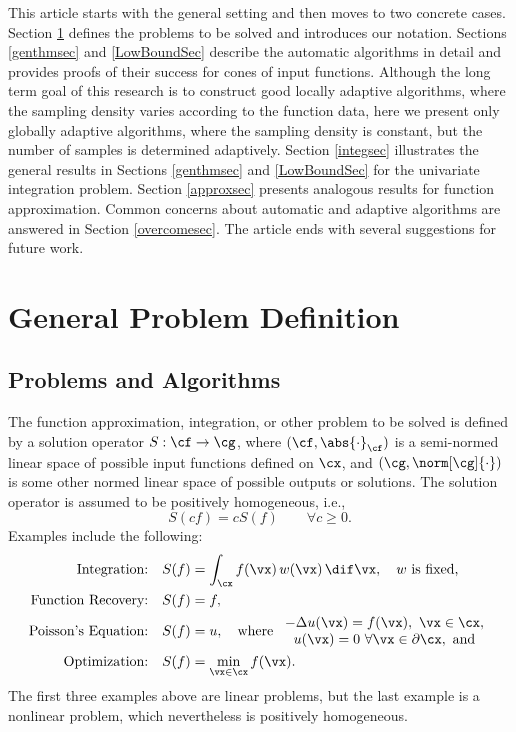 \documentclass[]{elsarticle}
\theoremstyle{definition}
\theoremstyle{remark}
\newcommand{\Fnorm}[1]{\abs{#1}_{\cf}}
\begin{document}
This article starts with the general setting and then moves to two concrete cases.  Section \ref{probdefsec} defines the problems to be solved and introduces our notation.  Sections \ref{genthmsec} and \ref{LowBoundSec} describe the automatic algorithms in detail and provides proofs of their success for cones of input functions.  Although the long term goal of this research is to construct good locally adaptive algorithms, where the sampling density varies according to the function data, here we present only globally adaptive algorithms, where the sampling density is constant, but the number of samples is determined adaptively.  Section \ref{integsec} illustrates the general results in Sections \ref{genthmsec} and \ref{LowBoundSec} for the univariate integration problem.  Section \ref{approxsec}  presents analogous results for function approximation.  Common concerns about automatic and adaptive algorithms are answered in Section \ref{overcomesec}. The article ends with several suggestions for future work.

\section{General Problem Definition} \label{probdefsec}

\subsection{Problems and Algorithms} The function approximation, integration, or other problem to be solved is defined by a solution operator $S:\cf \to \cg$, where $(\cf,\Fnorm{\cdot})$ is a semi-normed linear space of possible input functions defined on $\cx$, and $(\cg,\norm[\cg]{\cdot})$ is some other normed linear space of possible outputs or solutions. The solution operator is assumed to be positively homogeneous, i.e., 
\[
S(cf) = cS(f) \qquad \forall c\ge 0.
\]
Examples include the following:
\begin{align*}
\text{Integration:} \quad & S(f) = \int_{\cx} f(\vx) \, w(\vx) \, \dif \vx, \quad w \text{ is fixed,}\\
\text{Function Recovery:} \quad & S(f) = f, \\
\text{Poisson's Equation:} \quad & S(f) = u, \quad \text{where } \begin{array}{c} -\Delta u(\vx) = f(\vx), \ \vx \in \cx, \\ u(\vx)=0 \ \forall \vx \in \partial \cx, \text{ and}\end{array} \\
\text{Optimization:} \quad & S(f) = \min_{\vx \in \cx} f(\vx).
\end{align*}
The first three examples above are linear problems, but the last example is a nonlinear problem, which nevertheless is positively homogeneous.
\end{document}
